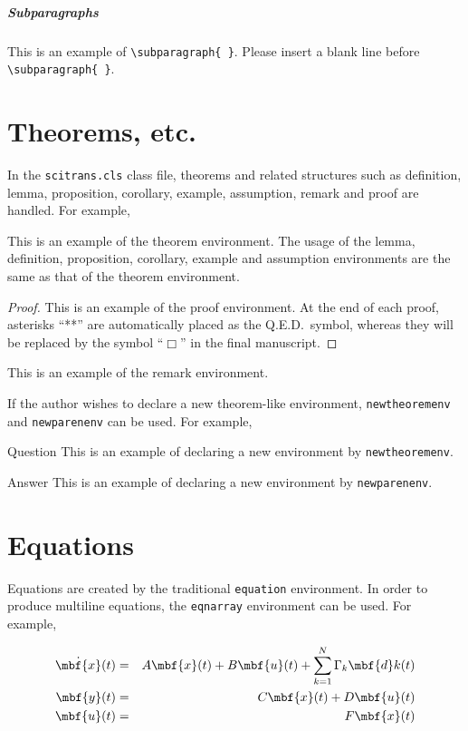 \subparagraph{Subparagraphs}
This is an example of \verb+\subparagraph{ }+.
Please insert a blank line before \verb+\subparagraph{ }+.


\section{Theorems, etc.}
In the {\tt scitrans.cls} class file,
theorems and related structures such as definition, lemma, proposition,
corollary, example, assumption, remark and proof are handled. 
For example,

\begin{theorem}
\label{theorem:1}
This is an example of the theorem environment.
The usage of the lemma, definition, proposition, corollary,
example and assumption environments 
are the same as that of the theorem environment.
\end{theorem}

\begin{proof}
This is an example of the proof environment. 
At the end of each proof, asterisks ``**'' are automatically placed
as the Q.E.D.\ symbol,
whereas they will be replaced by the symbol ``$\Box$'' in the final manuscript.
\end{proof}

\begin{remark}
\label{remark:1}
This is an example of the remark environment. 
\end{remark}

If the author wishes to declare a new theorem-like environment, 
\verb+newtheoremenv+ and \verb+newparenenv+ can be used.
For example,

\begin{newtheoremenv}{Question}
This is an example of declaring a new environment by \verb+newtheoremenv+.
\end{newtheoremenv}
\begin{newparenenv}{Answer}
This is an example of declaring a new environment by \verb+newparenenv+.
\end{newparenenv}



\section{Equations}
Equations are created by the traditional {\tt equation} environment. 
In order to produce multiline equations,
the {\tt eqnarray} environment can be used.
For example, 

\begin{eqnarray}
        \dot{\mbf{x}}(t) & = & A \mbf{x}(t) + B \mbf{u}(t) 
                               + \sum_{k=1}^N \Gamma_k \mbf{d}k(t)
                \label{eq:1}\\
        \mbf{y}(t) & = & C \mbf{x}(t) + D \mbf{u}(t)
                \label{eq:2}\\
        \mbf{u}(t) & = & F \mbf{x}(t)
                \label{eq:3}
\end{eqnarray}

